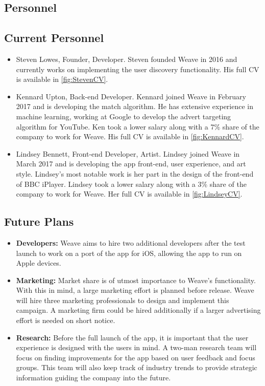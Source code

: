 \documentclass[12pt, a4paper]{article}
\newenvironment{main}
{\begin{spacing}{1.2}\setlength{\parskip}{0.5\baselineskip}}
{\end{spacing}\setlength{\parskip}{0pt}}
\begin{document}
\begin{main}
\section{Personnel}
\subsection{Current Personnel}
\begin{itemize}
	\item Steven Lowes, Founder, Developer. Steven founded Weave in 2016 and currently works on implementing the user discovery functionality. His full CV is available in \vref{fig:StevenCV}.
	\item Kennard Upton, Back-end Developer. Kennard joined Weave in February 2017 and is developing the match algorithm. He has extensive experience in machine learning, working at Google to develop the advert targeting algorithm for YouTube. Ken took a lower salary along with a 7\% share of the company to work for Weave. His full CV is available in \vref{fig:KennardCV}.
	\item Lindsey Bennett, Front-end Developer, Artist. Lindsey joined Weave in March 2017 and is developing the app front-end, user experience, and art style. Lindsey's most notable work is her part in the design of the front-end of BBC iPlayer. Lindsey took a lower salary along with a 3\% share of the company to work for Weave. Her full CV is available in \vref{fig:LindseyCV}.
\end{itemize}

\subsection{Future Plans}
\begin{itemize}
	\item \textbf{Developers:} Weave aims to hire two additional developers after the test launch to work on a port of the app for iOS, allowing the app to run on Apple devices.
	\item \textbf{Marketing:} Market share is of utmost importance to Weave's functionality. With this in mind, a large marketing effort is planned before release. Weave will hire three marketing professionals to design and implement this campaign. A marketing firm could be hired additionally if a larger advertising effort is needed on short notice.
	\item \textbf{Research:} Before the full launch of the app, it is important that the user experience is designed with the users in mind. A two-man research team will focus on finding improvements for the app based on user feedback and focus groups. This team will also keep track of industry trends to provide strategic information guiding the company into the future.
\end{itemize}


\end{main}
\end{document}
